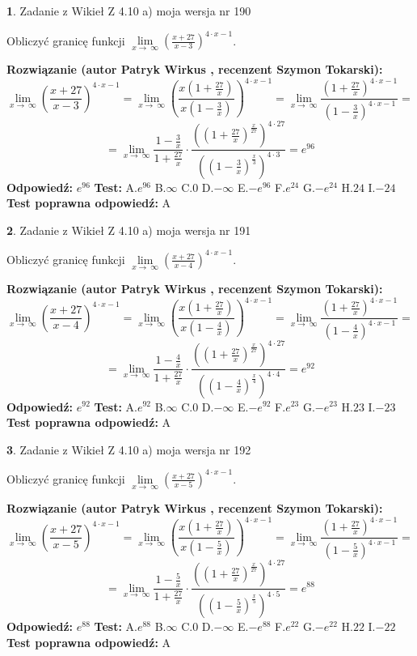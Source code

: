 \documentclass[12pt, a4paper]{article}
\theoremstyle{definition} %
\newtheorem{zad}{}
\newcommand{\zadStart}[1]{\begin{zad}#1\newline}
\newcommand{\zadStop}{\end{zad}}
\newcommand{\rozwStart}[2]{\noindent \textbf{Rozwiązanie (autor #1 , recenzent #2): }\newline}
\newcommand{\rozwStop}{\newline}
\newcommand{\odpStart}{\noindent \textbf{Odpowiedź:}\newline}
\newcommand{\odpStop}{\newline}
\newcommand{\testStart}{\noindent \textbf{Test:}\newline}
\newcommand{\testStop}{\newline}
\newcommand{\kluczStart}{\noindent \textbf{Test poprawna odpowiedź:}\newline}
\newcommand{\kluczStop}{\newline}
\begin{document}
\zadStart{Zadanie z Wikieł Z 4.10 a) moja wersja nr 190}

Obliczyć granicę funkcji  $\lim\limits_{x\to\ \infty}(\frac{x+27}{x-3})^{4\cdot x-1}$.
\zadStop
\rozwStart{Patryk Wirkus}{Szymon Tokarski}
$$\lim\limits_{x\to\ \infty}(\frac{x+27}{x-3})^{4\cdot x-1} = \lim\limits_{x\to\ \infty}(\frac{x(1+\frac{27}{x})}{x(1-\frac{3}{x})})^{4\cdot x-1}=\lim\limits_{x\to\ \infty}\frac{(1+\frac{27}{x})^{4\cdot x-1}}{(1-\frac{3}{x})^{4\cdot x-1}}=$$
$$=\lim\limits_{x\to\ \infty}\frac{1-\frac{3}{x}}{1+\frac{27}{x}}\cdot\frac{((1+\frac{27}{x})^{\frac{x}{27}})^{4\cdot27}}{((1-\frac{3}{x})^{\frac{x}{3}})^{4\cdot3}}=e^{96}$$
\rozwStop
\odpStart
$e^{96}$
\odpStop
\testStart
A.$e^{96}$ B.$\infty$ C.$0$ D.$-\infty$ E.$-e^{96}$
F.$e^{24}$ G.$-e^{24}$
H.$24$
I.$-24$
\testStop
\kluczStart
A
\kluczStop



\zadStart{Zadanie z Wikieł Z 4.10 a) moja wersja nr 191}

Obliczyć granicę funkcji  $\lim\limits_{x\to\ \infty}(\frac{x+27}{x-4})^{4\cdot x-1}$.
\zadStop
\rozwStart{Patryk Wirkus}{Szymon Tokarski}
$$\lim\limits_{x\to\ \infty}(\frac{x+27}{x-4})^{4\cdot x-1} = \lim\limits_{x\to\ \infty}(\frac{x(1+\frac{27}{x})}{x(1-\frac{4}{x})})^{4\cdot x-1}=\lim\limits_{x\to\ \infty}\frac{(1+\frac{27}{x})^{4\cdot x-1}}{(1-\frac{4}{x})^{4\cdot x-1}}=$$
$$=\lim\limits_{x\to\ \infty}\frac{1-\frac{4}{x}}{1+\frac{27}{x}}\cdot\frac{((1+\frac{27}{x})^{\frac{x}{27}})^{4\cdot27}}{((1-\frac{4}{x})^{\frac{x}{4}})^{4\cdot4}}=e^{92}$$
\rozwStop
\odpStart
$e^{92}$
\odpStop
\testStart
A.$e^{92}$ B.$\infty$ C.$0$ D.$-\infty$ E.$-e^{92}$
F.$e^{23}$ G.$-e^{23}$
H.$23$
I.$-23$
\testStop
\kluczStart
A
\kluczStop



\zadStart{Zadanie z Wikieł Z 4.10 a) moja wersja nr 192}

Obliczyć granicę funkcji  $\lim\limits_{x\to\ \infty}(\frac{x+27}{x-5})^{4\cdot x-1}$.
\zadStop
\rozwStart{Patryk Wirkus}{Szymon Tokarski}
$$\lim\limits_{x\to\ \infty}(\frac{x+27}{x-5})^{4\cdot x-1} = \lim\limits_{x\to\ \infty}(\frac{x(1+\frac{27}{x})}{x(1-\frac{5}{x})})^{4\cdot x-1}=\lim\limits_{x\to\ \infty}\frac{(1+\frac{27}{x})^{4\cdot x-1}}{(1-\frac{5}{x})^{4\cdot x-1}}=$$
$$=\lim\limits_{x\to\ \infty}\frac{1-\frac{5}{x}}{1+\frac{27}{x}}\cdot\frac{((1+\frac{27}{x})^{\frac{x}{27}})^{4\cdot27}}{((1-\frac{5}{x})^{\frac{x}{5}})^{4\cdot5}}=e^{88}$$
\rozwStop
\odpStart
$e^{88}$
\odpStop
\testStart
A.$e^{88}$ B.$\infty$ C.$0$ D.$-\infty$ E.$-e^{88}$
F.$e^{22}$ G.$-e^{22}$
H.$22$
I.$-22$
\testStop
\kluczStart
A
\kluczStop
\end{document}
